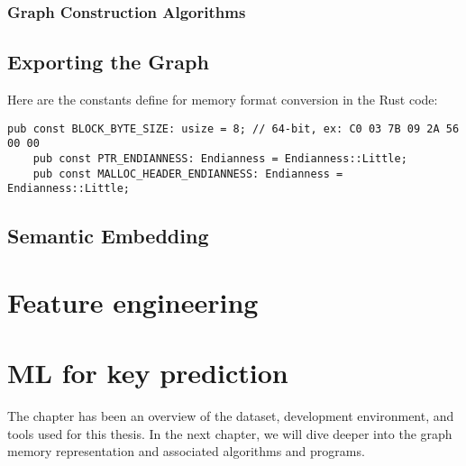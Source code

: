 \subsubsection{Graph Construction Algorithms}



\subsection{Exporting the Graph}


\begin{minipage}{\dimexpr\linewidth-20pt}
    Here are the constants define for memory format conversion in the Rust code:

   \begin{lstlisting}[style=rust, caption={Rust memory format constants in \textit{mem2graph}}]
    pub const BLOCK_BYTE_SIZE: usize = 8; // 64-bit, ex: C0 03 7B 09 2A 56 00 00
    pub const PTR_ENDIANNESS: Endianness = Endianness::Little;
    pub const MALLOC_HEADER_ENDIANNESS: Endianness = Endianness::Little;
   \end{lstlisting}
\end{minipage}

\subsection{Semantic Embedding}\label{sec:mem_2_graph:semantic_embedding}



\section{Feature engineering}

\section{ML for key prediction}

The chapter has been an overview of the dataset, development environment, and tools used for this thesis. In the next chapter, we will dive deeper into the graph memory representation and associated algorithms and programs.

